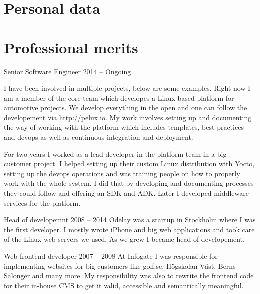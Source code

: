 \documentclass{twocolcv}
\begin{document}
\section*{Personal data}
\section*{Professional merits}
           {Senior Software Engineer}
           {2014 -- Ongoing}
           {
I have been involved in multiple projects, below are some examples.\newline\newline
{}
        {Right now I am a member of the core team which developes a Linux based platform for automotive projects. We develop everything in the open and one can follow the developement via http://pelux.io. My work involves setting up and documenting the way of working with the platform which includes templates, best practices and devops as well as continuous integration and deployment.\newline}
        
        {For two years I worked as a lead developer in the platform team in a big customer project. I helped setting up their custom Linux distribution with Yocto, setting up the devops operations and was training people on how to properly work with the whole system. I did that by developing and documenting processes they could follow and offering an SDK and ADK. Later I developed middleware services for the platform.}
}

     {Head of developemnt}
     {2008 -- 2014}
     {Odelay was a startup in Stockholm where I was the first developer. I mostly wrote iPhone and big web applications and took care of the Linux web servers we used. As we grew I became head of developement.}

     {Web frontend developer}
     {2007 -- 2008}
     {At Infogate I was responsible for implementing websites for big customers like golf.se, Högskolan Väst, Berns Salonger and many more. My responsibility was also to rewrite the frontend code for their in-house CMS to get it valid, accessible and semantically meaningful.}
\end{document}
